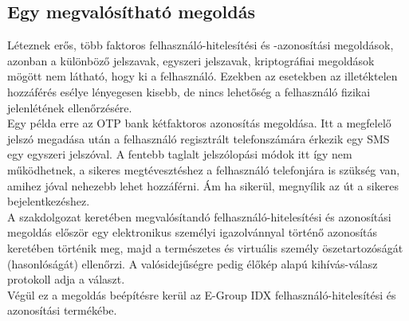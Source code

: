 \subsection{Egy megvalósítható megoldás}
Léteznek erős, több faktoros felhasználó-hitelesítési és -azonosítási megoldások, azonban a különböző jelszavak, egyszeri jelszavak, kriptográfiai megoldások mögött nem látható, hogy ki a felhasználó. Ezekben az esetekben az illetéktelen hozzáférés esélye lényegesen kisebb, de nincs lehetőség a felhasználó fizikai jelenlétének ellenőrzésére. 
\\Egy példa erre az OTP bank kétfaktoros azonosítás megoldása. Itt a megfelelő jelszó megadása után a felhasználó regisztrált telefonszámára érkezik egy SMS egy egyszeri jelszóval. A fentebb taglalt jelszólopási módok itt így nem működhetnek, a sikeres megtévesztéshez a felhasználó telefonjára is szükség van, amihez jóval nehezebb lehet hozzáférni. Ám ha sikerül, megnyílik az út a sikeres bejelentkezéshez.
\\A szakdolgozat keretében megvalósítandó felhasználó-hitelesítési és azonosítási megoldás először egy elektronikus személyi igazolvánnyal történő azonosítás keretében történik meg, majd a természetes és virtuális személy öszetartozóságát (hasonlóságát) ellenőrzi. A valósidejűségre pedig élőkép alapú kihívás-válasz protokoll adja a választ.
\\Végül ez a megoldás beépítésre kerül az E-Group IDX felhasználó-hitelesítési és azonosítási termékébe.